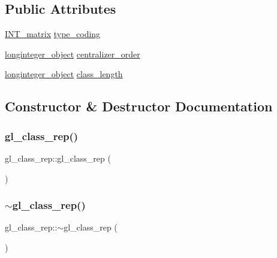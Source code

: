 \subsection*{Public Attributes}
\begin{DoxyCompactItemize}
\item 
\mbox{\hyperlink{class_i_n_t__matrix}{I\+N\+T\+\_\+matrix}} \mbox{\hyperlink{classgl__class__rep_af2df296c4e1491694e9d4ed68290b4f6}{type\+\_\+coding}}
\item 
\mbox{\hyperlink{classlonginteger__object}{longinteger\+\_\+object}} \mbox{\hyperlink{classgl__class__rep_a4243559e09c5b586ca14b8271bf35790}{centralizer\+\_\+order}}
\item 
\mbox{\hyperlink{classlonginteger__object}{longinteger\+\_\+object}} \mbox{\hyperlink{classgl__class__rep_a30489d66f224e7ed20435998af60f892}{class\+\_\+length}}
\end{DoxyCompactItemize}


\subsection{Constructor \& Destructor Documentation}
\mbox{\label{classgl__class__rep_afe8e1695688f4ab9e37f864e8b4531ce}} 
\subsubsection{\texorpdfstring{gl\+\_\+class\+\_\+rep()}{gl\_class\_rep()}}
{\footnotesize\ttfamily gl\+\_\+class\+\_\+rep\+::gl\+\_\+class\+\_\+rep (\begin{DoxyParamCaption}{ }\end{DoxyParamCaption})}

\mbox{\label{classgl__class__rep_ad22a227d8a4b23eb42aa563bb65e3f6d}} 
\subsubsection{\texorpdfstring{$\sim$gl\+\_\+class\+\_\+rep()}{~gl\_class\_rep()}}
{\footnotesize\ttfamily gl\+\_\+class\+\_\+rep\+::$\sim$gl\+\_\+class\+\_\+rep (\begin{DoxyParamCaption}{ }\end{DoxyParamCaption})}



